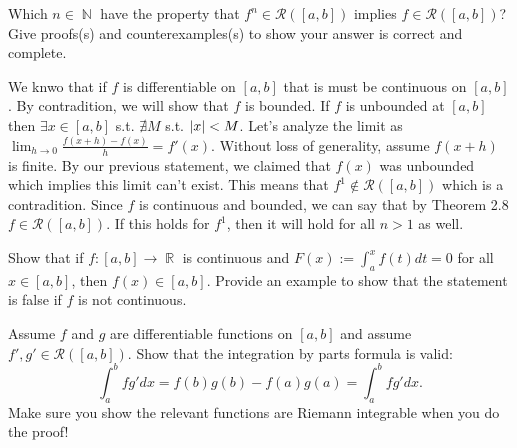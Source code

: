 \documentclass[12pt,letterpaper,boxed]{hmcpset}
\DeclareMathOperator{\N}{\mathbb{N}}
\DeclareMathOperator{\R}{\mathbb{R}}
\DeclarePairedDelimiter\abs{\lvert}{\rvert}%
\begin{document}

\begin{problem}[Exercise 2.12]
Which $n\in\N$ have the property that $f^{n} \in \mathcal{R}([a,b])$ implies $f\in\mathcal{R}([a,b])$? Give proofs(s) and counterexamples(s) to show your answer is correct and complete.
\end{problem}

\begin{solution}
We knwo that if $f$ is differentiable on $[a,b]$ that is must be continuous on $[a,b]$. By contradition, we will show that $f$ is bounded. If $f$ is unbounded at $[a,b]$ then $\exists x\in[a,b]$ s.t. $\nexists M$ s.t. $\abs{x} < M$. Let's analyze the limit as $\lim_{h \rightarrow 0}\frac{f(x + h) - f(x)}{h} = f'(x)$. Without loss of generality, assume $f(x + h)$ is finite. By our previous statement, we claimed that $f(x)$ was unbounded which implies this limit can't exist. This means that $f^{1} \notin \mathcal{R}([a,b])$ which is a contradition. Since $f$ is continuous and bounded, we can say that by Theorem 2.8 $f\in\mathcal{R}([a,b]).$ If this holds for $f^{1}$, then it will hold for all $n > 1$ as well.
\end{solution}

\begin{problem}[Exercise 2.15]
Show that if $f : [a, b] \rightarrow \R$ is continuous and $F(x) := \int_{a}^{x} f(t) dt = 0$ for all $x \in [a, b]$, then $f(x) \in [a,b].$ Provide an example to show that the statement is false if $f$ is not continuous.
\end{problem}

\begin{solution}

\end{solution}


\begin{problem}[Exercise 2.16]
Assume $f$ and $g$ are differentiable functions on $[a,b]$ and assume $f', g' \in \mathcal{R}([a,b]).$ Show that the integration by parts formula is valid: $$\int_{a}^{b} fg'dx = f(b)g(b) - f(a)g(a) = \int_{a}^{b} fg'dx.$$ Make sure you show the relevant functions are Riemann integrable when you do the proof!
\end{problem}


\begin{solution}

\end{solution}
\end{document}
